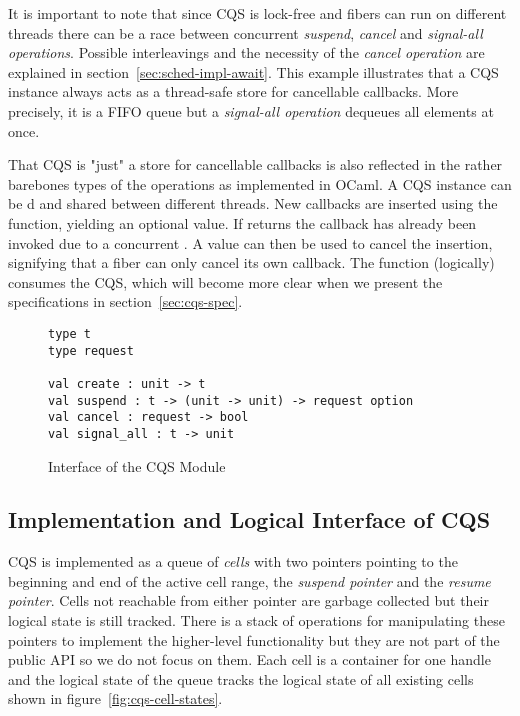 It is important to note that since CQS is lock-free and fibers can run on different threads there can be a race between concurrent \textit{suspend}, \textit{cancel} and \textit{signal-all operations}.
Possible interleavings and the necessity of the \textit{cancel operation} are explained in section~\ref{sec:sched-impl-await}.
This example illustrates that a CQS instance always acts as a thread-safe store for cancellable callbacks.
More precisely, it is a FIFO queue but a \textit{signal-all operation} dequeues all elements at once.


That CQS is "just" a store for cancellable callbacks is also reflected in the rather barebones types of the operations as implemented in OCaml.
A CQS instance can be d and shared between different threads.
New callbacks are inserted using the  function, yielding an optional  value.
If  returns  the callback has already been invoked due to a concurrent .
A  value can then be used to cancel the insertion, signifying that a fiber can only cancel its own callback.
The  function (logically) consumes the CQS, which will become more clear when we present the specifications in section~\ref{sec:cqs-spec}.

\begin{figure}[ht]
  \begin{verbatim}
type t
type request

val create : unit -> t
val suspend : t -> (unit -> unit) -> request option
val cancel : request -> bool
val signal_all : t -> unit
\end{verbatim}
  \caption{Interface of the CQS Module}
\end{figure}

\subsection{Implementation and Logical Interface of CQS}
\label{sec:cqs-impl}


CQS is implemented as a queue of \textit{cells} with two pointers pointing to the beginning and end of the active cell range, the \textit{suspend pointer} and the \textit{resume pointer}.
Cells not reachable from either pointer are garbage collected but their logical state is still tracked.
There is a stack of operations for manipulating these pointers to implement the higher-level functionality but they are not part of the public API so we do not focus on them.
Each cell is a container for one handle and the logical state of the queue tracks the logical state of all existing cells shown in figure~\ref{fig:cqs-cell-states}.

